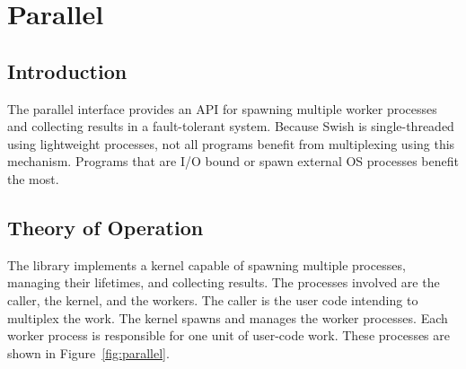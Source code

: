 %
%
%

\chapter {Parallel}\label{chap:parallel}

\section{Introduction}

The parallel interface provides an API for spawning multiple worker
processes and collecting results in a fault-tolerant system. Because
Swish is single-threaded using lightweight processes, not all programs
benefit from multiplexing using this mechanism. Programs that are I/O
bound or spawn external OS processes benefit the most.

\section{Theory of Operation}

The  library implements a kernel capable of
spawning multiple processes, managing their lifetimes, and collecting
results. The processes involved are the caller, the kernel, and the
workers. The caller is the user code intending to multiplex the
work. The kernel spawns and manages the worker processes. Each worker
process is responsible for one unit of user-code work. These processes
are shown in Figure~\ref{fig:parallel}.

